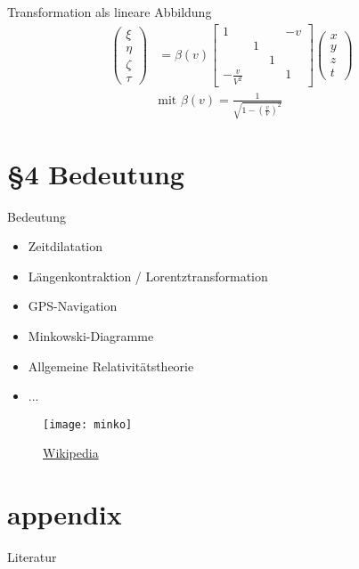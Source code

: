 \documentclass[]{beamer}%
\begin{document}
\begin{frame}{Transformation als lineare Abbildung}
    \begin{align*}
        \begin{pmatrix}
            \xi \\
            \eta \\
            \zeta\\
            \tau
        \end{pmatrix}
    &=
    \beta \left( v \right)
        \begin{bmatrix}
             1
            &
            &
            &-v
            \\%
            &1
            &
            &
            \\%
            &
            &1
            &
            \\%
             -\frac{v}{V^2}
            &
            &
            &1
        \end{bmatrix}
        \begin{pmatrix}
            x\\y\\z\\t
        \end{pmatrix}\\[30pt]
            &\text{mit }\beta \left( v \right)=\frac{1}{\sqrt{1-\left( \frac{v}{V} \right)^2}}
    \end{align*}
\end{frame}

\section{§4 Bedeutung}
\begin{frame}{Bedeutung}
    \begin{itemize}
        \item Zeitdilatation
        \item Längenkontraktion / Lorentztransformation
        \item GPS-Navigation
        \item Minkowski-Diagramme
        \item Allgemeine Relativitätstheorie
        \item ...
    \end{itemize}
    \begin{figure}[h]
        \centering
        \texttt{[image: minko]}
        \caption{\href{https://de.wikipedia.org/wiki/Minkowski-Diagramm}{Wikipedia}}
    \end{figure}
\end{frame}

\appendix
\section{appendix}
\begin{frame}
\end{frame}

\begin{frame}{Literatur}
    
    
\end{frame}
\end{document}
